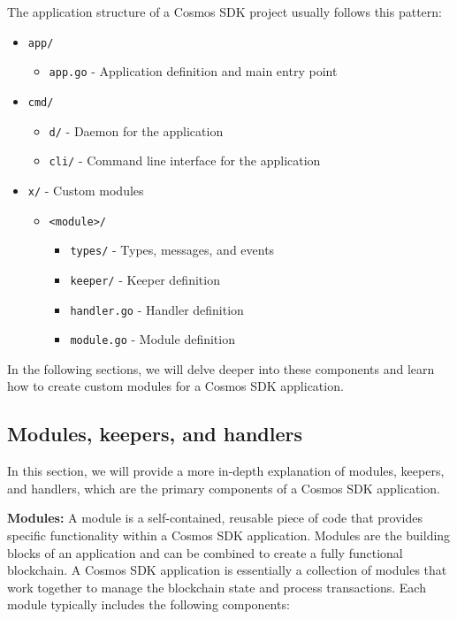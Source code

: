 \documentclass{article}
\begin{document}
The application structure of a Cosmos SDK project usually follows this pattern:

\begin{itemize}
\item \texttt{app/}
\begin{itemize}
\item \texttt{app.go} - Application definition and main entry point
\end{itemize}
\item \texttt{cmd/}
\begin{itemize}
\item \texttt{d/} - Daemon for the application
\item \texttt{cli/} - Command line interface for the application
\end{itemize}
\item \texttt{x/} - Custom modules
\begin{itemize}
\item \texttt{<module>/}
\begin{itemize}
\item \texttt{types/} - Types, messages, and events
\item \texttt{keeper/} - Keeper definition
\item \texttt{handler.go} - Handler definition
\item \texttt{module.go} - Module definition
\end{itemize}
\end{itemize}
\end{itemize}

In the following sections, we will delve deeper into these components and learn how to create custom modules for a Cosmos SDK application.
%

\subsection{Modules, keepers, and handlers}

In this section, we will provide a more in-depth explanation of modules, keepers, and handlers, which are the primary components of a Cosmos SDK application.

\textbf{Modules:} A module is a self-contained, reusable piece of code that provides specific functionality within a Cosmos SDK application. Modules are the building blocks of an application and can be combined to create a fully functional blockchain. A Cosmos SDK application is essentially a collection of modules that work together to manage the blockchain state and process transactions. Each module typically includes the following components:
\end{document}
